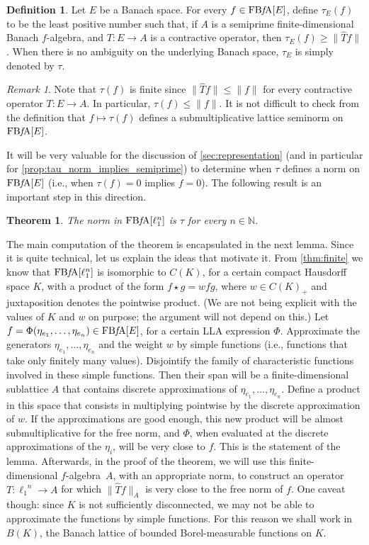\documentclass{memo-l}
\newtheorem{thm}[theorem]{Theorem}
\theoremstyle{definition}
\newtheorem{defn}[theorem]{Definition}
\theoremstyle{remark}
\newtheorem{rem}[theorem]{Remark}
\numberwithin{section}{chapter}
\numberwithin{equation}{chapter}
\newcommand\N{\ensuremath{\mathbb{N}}}
\newcommand{\el}[1]{\ensuremath{\ell_{#1}}}
\newcommand{\falg}{$f\!$-algebra}
\newcommand{\FBFA}[1]{\operatorname{FB{\it f}\!A}[#1]}
\begin{document}
\begin{defn}
    Let $E$ be a Banach space. For every $f \in \FBFA E$, define
    $\tau_E (f)$ to be the least positive number such that, if $A$ is a
    semiprime finite-dimensional Banach \falg, and
    $T\colon E\to A$ is a contractive operator, then $\tau_E (f)\ge \|\hat{T}f\|$.
    When there is no ambiguity on the underlying Banach space, $\tau _E$ is simply
    denoted by $\tau $.
\end{defn}

\begin{rem}
    Note that $\tau (f)$ is finite since $\|\hat{T}f\|\le
    \|f\|$ for every contractive operator $T\colon E\to A$. In
    particular, $\tau (f)\le \|f\|$. It is not difficult to check from
    the definition that $f\mapsto \tau (f)$ defines a
    submultiplicative lattice seminorm on $\FBFA E$.
\end{rem}

It will be very valuable for the discussion of
\cref{sec:representation} (and in particular for
\cref{prop:tau_norm_implies_semiprime}) to determine when $\tau$ defines a norm on $\FBFA E$ (i.e., when $\tau (f)=0$ implies
$f=0$). The following result is an important step in this direction.

\begin{thm}\label{thm:norm_fin_dim}
    The norm in $\FBFA{\el 1^{n}}$ is $\tau $ for every $n \in \N$.
\end{thm}

The main computation of the theorem is encapsulated in the next
lemma. Since it is quite technical, let us explain the ideas that
motivate it. From \cref{thm:finite} we know that $\FBFA{\el 1^{n}}$
is isomorphic to $C(K)$, for a certain compact Hausdorff space $K$,
with a product of the form $f\star g=wfg$, where $w \in C(K)_+$ and
juxtaposition denotes the pointwise product. (We are not being
explicit with the values of $K$ and $w$ on purpose; the argument will
not depend on this.) Let $f=\Phi (\eta _{e_1},\ldots ,\eta _{e_n}) \in
\FBFA E$, for a certain LLA expression
$\Phi $. Approximate the generators
$\eta _{e_1},\ldots ,\eta _{e_n}$ and the weight $w$ by simple
functions (i.e., functions that take only finitely many values).
Disjointify the family of characteristic functions involved in these
simple functions. Then their span will be a finite-dimensional
sublattice $A$ that contains discrete approximations of $\eta _{e_1},\ldots
,\eta _{e_n}$. Define a product in this space that consists in
multiplying pointwise by the discrete approximation of $w$. If the
approximations are good enough, this new product will be almost
submultiplicative for the free norm, and $\Phi $, when evaluated at
the discrete approximations of the $\eta _i$, will be very close to
$f$. This is the statement of the lemma. Afterwards, in the proof of the theorem, we will use this
finite-dimensional \falg\ $A$, with an appropriate norm, to construct
an operator $T\colon \el 1^{n}\to A$ for which $\|\hat{T}f\|_A$ is
very close to the free norm of $f$. One caveat though: since $K$ is not sufficiently disconnected, we may not be
able to approximate the functions by simple functions. For this reason
we shall work in $B(K)$, the Banach lattice of bounded
Borel-measurable functions on $K$.
\end{document}
